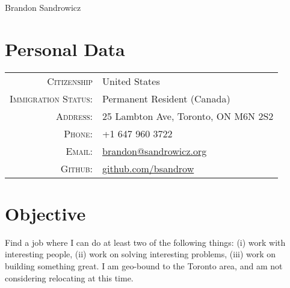 \documentclass[a4paper,10pt]{article}
\begin{document}
    \pagestyle{empty} %

    
        \par{\centering
            {\Huge Brandon Sandrowicz }
            \bigskip\par}
    

    
        \section{Personal Data}
        \begin{tabular}{ r l }
        \textsc{Citizenship}                    & United States\\
        \textsc{Immigration Status:}            & Permanent Resident (Canada)\\
        \textsc{Address:}                       & 25 Lambton Ave, Toronto, ON M6N 2S2\\
        \textsc{Phone:}                         & +1 647 960 3722\\
        \textsc{Email:}                         & \href{mailto:brandon@sandrowicz.org}{brandon@sandrowicz.org}\\
        \textsc{Github:}                        & \href{http://github.com/bsandrow}{github.com/bsandrow}\\
        \end{tabular}
    

    
        \section{Objective}
        Find a job where I can do at least two of the following things: (i) work with
        interesting people, (ii) work on solving interesting problems, (iii) work on
        building something great. I am geo-bound to the Toronto area, and am
        not considering relocating at this time.
    

    
\end{document}
